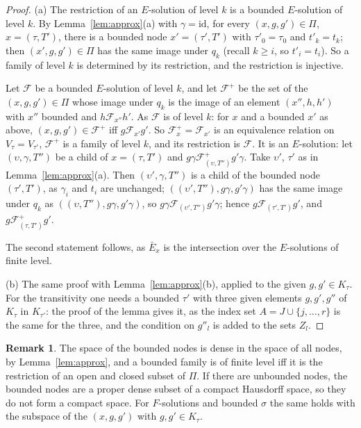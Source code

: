 \documentclass[11pt]{amsart}
\theoremstyle{definition}
\newtheorem{rem}[thm]{Remark}
\newcommand{\id}{\mathrm{id}}
\begin{document}
\begin{proof}
(a) The restriction of an $E$-solution of level $k$ is a bounded
$E$-solution of level $k$. By Lemma~\ref{lem:approx}(a) with
$\gamma=\id$, for every $(x,g,g')\in\Pi$, $x=(\tau,T')$, there is a
bounded node $x'=(\tau',T')$ with $\tau'_0=\tau_0$ and $t'_k=t_k$;
then $(x',g,g')\in\Pi$ has the same image under $q_k$ (recall $k\ge
i$, so $t'_i=t_i$). So a family of level $k$ is determined by its
restriction, and the restriction is injective.

Let $\mathcal F$ be a bounded $E$-solution of level $k$, and let
$\mathcal F^+$ be the set of the $(x,g,g')\in\Pi$ whose image under
$q_k$ is the image of an element $(x'',h,h')$ with $x''$ bounded and
$h\mathrel{\mathcal F_{x''}}h'$. As $\mathcal F$ is of level $k$: for
$x$ and a bounded $x'$ as above, $(x,g,g')\in\mathcal F^+$ iff
$g\mathrel{\mathcal F_{x'}}g'$. So $\mathcal F^+_x=\mathcal F_{x'}$
is an equivalence relation on $V_\tau=V_{\tau'}$, $\mathcal F^+$ is a
family of level $k$, and its restriction is $\mathcal F$. It is an
$E$-solution: let $(\upsilon,\gamma,T'')$ be a child of $x=(\tau,T')$
and $g\gamma\mathrel{\mathcal F^+_{(\upsilon,T'')}}g'\gamma$. Take
$\upsilon'$, $\tau'$ as in Lemma~\ref{lem:approx}(a). Then
$(\upsilon',\gamma,T'')$ is a child of the bounded node
$(\tau',T')$, as $\gamma_i$ and $t_i$ are unchanged; $((\upsilon',
T''),g\gamma,g'\gamma)$ has the same image under $q_k$ as
$((\upsilon,T''),g\gamma,g'\gamma)$, so $g\gamma\mathrel{\mathcal
F_{(\upsilon',T'')}}g'\gamma$; hence $g\mathrel{\mathcal F_{(\tau',
T')}}g'$, and $g\mathrel{\mathcal F^+_{(\tau,T')}}g'$.

The second statement follows, as $\bar E_x$ is the intersection over
the $E$-solutions of finite level.

(b) The same proof with Lemma~\ref{lem:approx}(b), applied to the
given $g,g'\in K_\tau$. For the transitivity one needs a bounded
$\tau'$ with three given elements $g,g',g''$ of $K_\tau$ in
$K_{\tau'}$: the proof of the lemma gives it, as the index set
$A=J\cup\{j,\dots,r\}$ is the same for the three, and the condition
on $g''_l$ is added to the sets $Z_l$.
\end{proof}

\begin{rem}
The space of the bounded nodes is dense in the space of all nodes,
by Lemma~\ref{lem:approx}, and a bounded family is of finite level
iff it is the restriction of an open and closed subset of $\Pi$. If
there are unbounded nodes, the bounded nodes are a proper dense
subset of a compact Hausdorff space, so they do not form a compact
space. For $F$-solutions and bounded $\sigma$ the same holds with the subspace of the
$(x,g,g')$ with $g,g'\in K_\tau$.
\end{rem}
\end{document}
